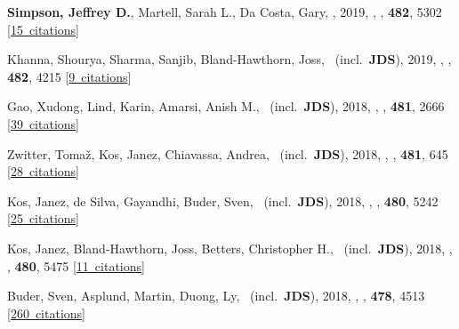 \item[{\color{numcolor}\scriptsize25}] \textbf{Simpson, Jeffrey D.}, Martell, Sarah L., Da Costa, Gary, \etal, 2019, , \mnras, \textbf{482}, 5302 [\href{https://ui.adsabs.harvard.edu/#abs/2019MNRAS.482.5302S}{15~citations}]

\item[{\color{numcolor}\scriptsize24}] Khanna, Shourya, Sharma, Sanjib, Bland-Hawthorn, Joss, \etal\ (incl.\ \textbf{JDS}), 2019, , \mnras, \textbf{482}, 4215 [\href{https://ui.adsabs.harvard.edu/#abs/2019MNRAS.482.4215K}{9~citations}]

\item[{\color{numcolor}\scriptsize23}] Gao, Xudong, Lind, Karin, Amarsi, Anish M., \etal\ (incl.\ \textbf{JDS}), 2018, , \mnras, \textbf{481}, 2666 [\href{https://ui.adsabs.harvard.edu/#abs/2018MNRAS.481.2666G}{39~citations}]

\item[{\color{numcolor}\scriptsize22}] Zwitter, Toma{\v{z}}, Kos, Janez, Chiavassa, Andrea, \etal\ (incl.\ \textbf{JDS}), 2018, , \mnras, \textbf{481}, 645 [\href{https://ui.adsabs.harvard.edu/#abs/2018MNRAS.481..645Z}{28~citations}]

\item[{\color{numcolor}\scriptsize21}] Kos, Janez, de Silva, Gayandhi, Buder, Sven, \etal\ (incl.\ \textbf{JDS}), 2018, , \mnras, \textbf{480}, 5242 [\href{https://ui.adsabs.harvard.edu/#abs/2018MNRAS.480.5242K}{25~citations}]

\item[{\color{numcolor}\scriptsize20}] Kos, Janez, Bland-Hawthorn, Joss, Betters, Christopher H., \etal\ (incl.\ \textbf{JDS}), 2018, , \mnras, \textbf{480}, 5475 [\href{https://ui.adsabs.harvard.edu/#abs/2018MNRAS.480.5475K}{11~citations}]

\item[{\color{numcolor}\scriptsize19}] Buder, Sven, Asplund, Martin, Duong, Ly, \etal\ (incl.\ \textbf{JDS}), 2018, , \mnras, \textbf{478}, 4513 [\href{https://ui.adsabs.harvard.edu/#abs/2018MNRAS.478.4513B}{260~citations}]

